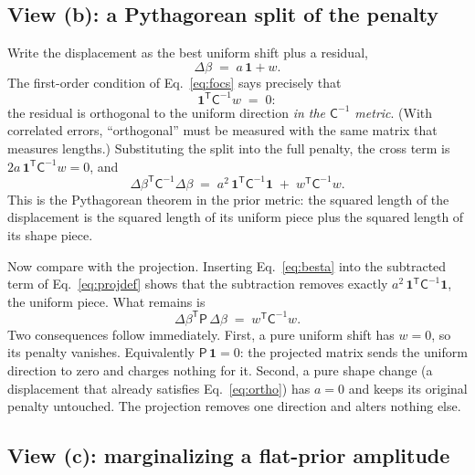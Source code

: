 \documentclass[11pt]{article}
\newcommand{\ones}{\mathbf{1}} %
\newcommand{\Cov}{\mathsf{C}}
\newcommand{\Prec}{\mathsf{P}}
\newcommand{\T}{^{\mathsf{T}}}
\begin{document}
\subsection{View (b): a Pythagorean split of the penalty}
\label{sec:viewb}

Write the displacement as the best uniform shift plus a residual,
\begin{equation}
  \Delta\beta \;=\; a\,\ones + w .
  \label{eq:split}
\end{equation}
The first-order condition of Eq.~\eqref{eq:focs} says precisely that
\begin{equation}
  \ones\T \Cov^{-1} w \;=\; 0:
  \label{eq:ortho}
\end{equation}
the residual is orthogonal to the uniform direction \emph{in the
$\Cov^{-1}$ metric}.  (With correlated errors, ``orthogonal'' must be
measured with the same matrix that measures lengths.)  Substituting the
split into the full penalty, the cross term is
$2 a\,\ones\T \Cov^{-1} w = 0$, and
\begin{equation}
  \Delta\beta\T \Cov^{-1} \Delta\beta
  \;=\;
  a^2\, \ones\T \Cov^{-1} \ones
  \;+\;
  w\T \Cov^{-1} w .
  \label{eq:pythagoras}
\end{equation}
This is the Pythagorean theorem in the prior metric: the squared length
of the displacement is the squared length of its uniform piece plus the
squared length of its shape piece.

Now compare with the projection.  Inserting Eq.~\eqref{eq:besta} into
the subtracted term of Eq.~\eqref{eq:projdef} shows that the subtraction
removes exactly $a^2\,\ones\T \Cov^{-1} \ones$, the uniform piece.
What remains is
\begin{equation}
  \Delta\beta\T \Prec\, \Delta\beta
  \;=\;
  w\T \Cov^{-1} w .
  \label{eq:Pisw}
\end{equation}
Two consequences follow immediately.  First, a pure uniform shift has
$w = 0$, so its penalty vanishes.  Equivalently $\Prec\,\ones = 0$:
the projected matrix sends the uniform direction to zero and charges
nothing for it.  Second, a pure shape change (a displacement that
already satisfies Eq.~\eqref{eq:ortho}) has $a = 0$ and keeps its
original penalty untouched.  The projection removes one direction and
alters nothing else.

\subsection{View (c): marginalizing a flat-prior amplitude}
\label{sec:viewc}
\end{document}
